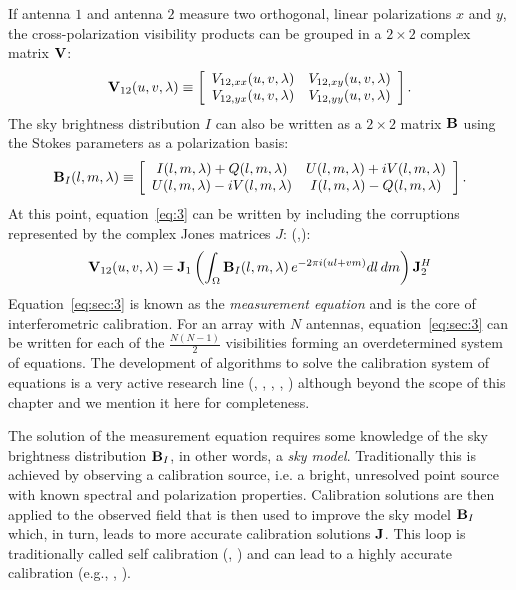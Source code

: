 If antenna $1$ and antenna $2$ measure two orthogonal, linear polarizations $x$ and $y$, the cross-polarization visibility products can be grouped in a $2 \times 2$ complex matrix ${\bf V}$:
\begin{equation}
    {\bf V}_{12} (u,v,\lambda) \equiv 
    \left[ 
    \begin{array}{cc}
    V_{12,xx} (u,v,\lambda) & V_{12,xy} (u,v,\lambda) \\
    V_{12,yx} (u,v,\lambda) & V_{12,yy} (u,v,\lambda) \\
    \end{array}
    \right].   
\label{eq:sec:1}
\end{equation} 
The sky brightness distribution $I$ can also be written as a $2 \times 2$ matrix ${\bf B}$ using the Stokes parameters as a polarization basis:
\begin{equation}
    {\bf B}_I (l,m,\lambda) \equiv 
    \left[
    \begin{array}{cc}
    I (l,m,\lambda) + Q (l,m,\lambda) & U (l,m,\lambda) + iV (l,m,\lambda) \\
    U (l,m,\lambda) - iV (l,m,\lambda) & I (l,m,\lambda) - Q (l,m,\lambda) \\
    \end{array}
    \right].   
\label{eq:sec:2}
\end{equation} 
At this point, equation~\ref{eq:3} can be written by including the corruptions represented by the complex Jones matrices $J$: (\cite{hamaker96},\cite{smirnov11}):
\begin{equation}
{\bf V}_{12} (u,v,\lambda) = {\bf J}_1 \left( \int_\Omega {\bf B}_I (l, m, \lambda) \, e^{-2 \pi i (ul + vm)} dl \, dm  \right) {\bf J}_2^H
\label{eq:sec:3}
\end{equation} 
Equation~\ref{eq:sec:3} is known as the {\it measurement equation} and is the core of interferometric calibration. For an array with $N$ antennas, equation~\ref{eq:sec:3} can be written for each of the $\frac{N (N - 1)}{2}$ visibilities forming an overdetermined system of equations. The development of  algorithms to solve the calibration system of equations is a very active research line (\cite{mitchell08}, \cite{kazemi11}, \cite{tasse14}, \cite{yatawatta15}, \cite{smirnov15}) although beyond the scope of this chapter and we mention it here for completeness.

The solution of the measurement equation requires some knowledge of the sky brightness distribution ${\bf B}_I$, in other words, a {\it sky model}. Traditionally this is achieved by observing a calibration source, i.e. a bright, unresolved point source with known spectral and polarization properties. Calibration solutions are then applied to the observed field that is then used to improve the sky model ${\bf B}_I$ which, in turn, leads to more accurate calibration solutions ${\bf J}$. This loop is traditionally called self calibration (\cite{cornwell81}, \cite{pearson84}) and can lead to a highly accurate calibration (e.g., \cite{bernardi10}, \cite{smirnov11b}).

